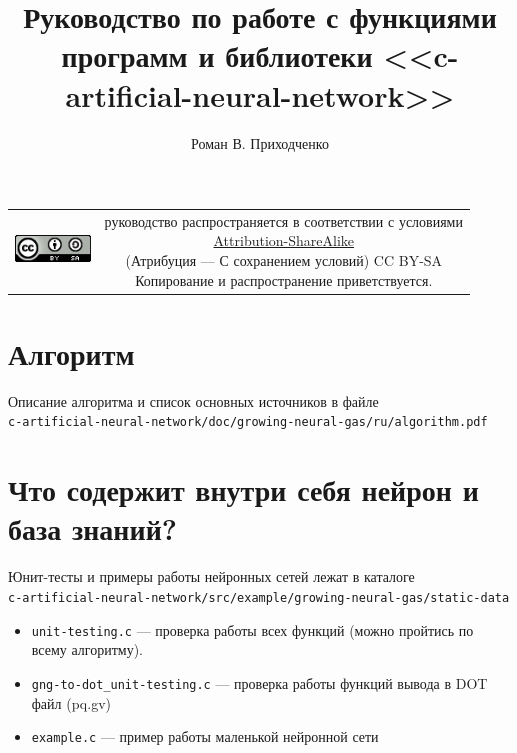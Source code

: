 \documentclass[unicode, 12pt, a4paper,oneside,fleqn]{article}
\author{Роман В. Приходченко}
\title{Руководство по работе с функциями программ и библиотеки
  <<c-artificial-neural-network>>}
\begin{document}
\renewcommand\bibname{СПИСОК ЛИТЕРАТУРЫ}
\renewcommand\refname{\centering Список литературы}
\renewcommand\contentsname{\centering Содержание}



\makeatletter %
\maketitle

\begin{table}[ht]
  \begin{tabular}{cc}
    \includegraphics[width=2cm]{../../../CC_BY-SA_88x31.png} &
    \shortstack{руководство распространяется в соответствии с
      условиями\\
      \href{http://creativecommons.org/licenses/by-sa/3.0/}{Attribution-ShareAlike} \\
      (Атрибуция — С сохранением условий) CC BY-SA \\
      Копирование и распространение приветствуется.}
  \end{tabular}
\end{table}

\newpage
\tableofcontents

\section{Алгоритм}
Описание алгоритма и список основных источников в файле\\
\verb'c-artificial-neural-network/doc/growing-neural-gas/ru/algorithm.pdf'


\clearpage
\section{Что содержит внутри себя нейрон и база знаний?}

Юнит-тесты и примеры работы нейронных сетей лежат в каталоге\\
\verb'c-artificial-neural-network/src/example/growing-neural-gas/static-data'
\begin{itemize}
\item \verb'unit-testing.c' --- проверка работы всех функций (можно
  пройтись по всему алгоритму). 
\item \verb'gng-to-dot_unit-testing.c' --- проверка работы функций
  вывода в DOT файл (pq.gv)
\item \verb'example.c' --- пример работы маленькой нейронной сети
\end{itemize}
\end{document}
